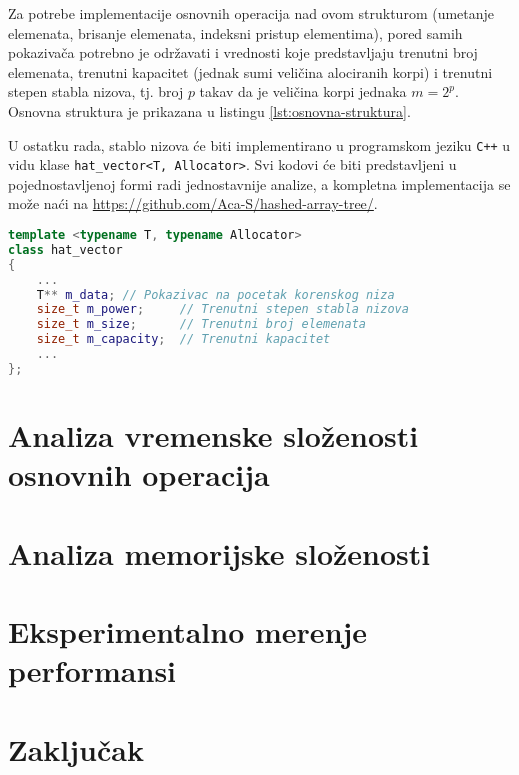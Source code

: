 \documentclass[a4paper]{article}
\begin{document}
Za potrebe implementacije osnovnih operacija nad ovom strukturom (umetanje elemenata, brisanje elemenata, indeksni pristup elementima), pored samih pokazivača potrebno je održavati i vrednosti koje predstavljaju trenutni broj elemenata, trenutni kapacitet (jednak sumi veličina alociranih korpi) i trenutni stepen stabla nizova, tj. broj $p$ takav da je veličina korpi jednaka $m = 2^p$. Osnovna struktura je prikazana u listingu \ref{lst:osnovna-struktura}.

U ostatku rada, stablo nizova će biti implementirano u programskom jeziku \verb|C++| u vidu klase \verb|hat_vector<T, Allocator>|. Svi kodovi će biti predstavljeni u pojednostavljenoj formi radi jednostavnije analize, a kompletna implementacija se može naći na \url{https://github.com/Aca-S/hashed-array-tree/}.

\begin{lstlisting}[language=C++, caption={Osnovna struktura stabla nizova}, captionpos=b, label={lst:osnovna-struktura}]
template <typename T, typename Allocator>
class hat_vector
{
    ...
    T** m_data; // Pokazivac na pocetak korenskog niza
    size_t m_power;     // Trenutni stepen stabla nizova
    size_t m_size;      // Trenutni broj elemenata
    size_t m_capacity;  // Trenutni kapacitet
    ...
};
\end{lstlisting}

\section{Analiza vremenske složenosti osnovnih operacija}

\section{Analiza memorijske složenosti}

\section{Eksperimentalno merenje performansi}

\section{Zaključak}

\appendix
 

\end{document}
